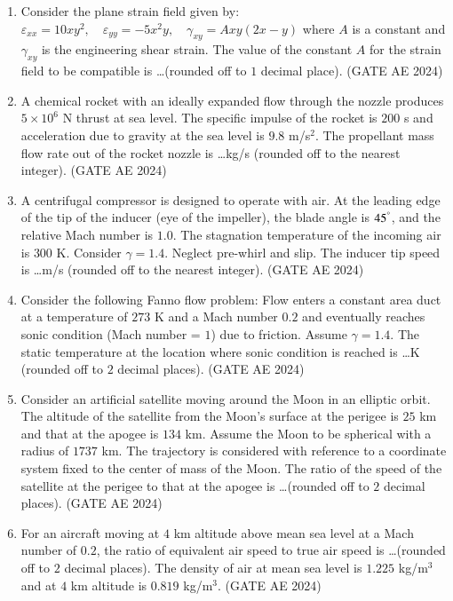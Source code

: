 \documentclass[journal,12pt,onecolumn]{IEEEtran}
\theoremstyle{remark}
\begin{document}
\begin{enumerate}
\item Consider the plane strain field given by:
$
\varepsilon_{xx} = 10xy^2, \quad \varepsilon_{yy} = -5x^2y, \quad \gamma_{xy} = Axy(2x - y)
$
where $A$ is a constant and $\gamma_{xy}$ is the engineering shear strain. The value of the constant $A$ for the strain field to be compatible is \dots (rounded off to $1$ decimal place).
\hfill(GATE AE 2024)

\item A chemical rocket with an ideally expanded flow through the nozzle produces $5 \times 10^6$ N thrust at sea level. The specific impulse of the rocket is $200$ s and acceleration due to gravity at the sea level is $9.8$ m/s$^2$. The propellant mass flow rate out of the rocket nozzle is \dots kg/s (rounded off to the nearest integer).
\hfill(GATE AE 2024)

\item A centrifugal compressor is designed to operate with air. At the leading edge of the tip of the inducer (eye of the impeller), the blade angle is $45^\degree$, and the relative Mach number is $1.0$. The stagnation temperature of the incoming air is $300$ K. Consider $\gamma = 1.4$. Neglect pre-whirl and slip. The inducer tip speed is \dots m/s (rounded off to the nearest integer).
\hfill(GATE AE 2024)

\item Consider the following Fanno flow problem: Flow enters a constant area duct at a temperature of $273$ K and a Mach number $0.2$ and eventually reaches sonic condition (Mach number = $1$) due to friction. Assume $\gamma = 1.4$. The static temperature at the location where sonic condition is reached is \dots K (rounded off to $2$ decimal places).
\hfill(GATE AE 2024)

\item Consider an artificial satellite moving around the Moon in an elliptic orbit. The altitude of the satellite from the Moon's surface at the perigee is $25$ km and that at the apogee is $134$ km. Assume the Moon to be spherical with a radius of $1737$ km. The trajectory is considered with reference to a coordinate system fixed to the center of mass of the Moon. The ratio of the speed of the satellite at the perigee to that at the apogee is \dots (rounded off to $2$ decimal places).
\hfill(GATE AE 2024)

\item For an aircraft moving at $4$ km altitude above mean sea level at a Mach number of $0.2$, the ratio of equivalent air speed to true air speed is \dots (rounded off to $2$ decimal places). The density of air at mean sea level is $1.225$ kg/m$^3$ and at $4$ km altitude is $0.819$ kg/m$^3$.
\hfill(GATE AE 2024)


\end{enumerate}
\end{document}
